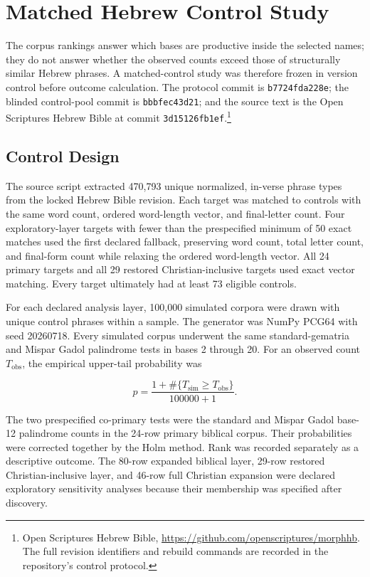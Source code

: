 \section{Matched Hebrew Control Study}

The corpus rankings answer which bases are productive inside the selected names; they do not answer whether the observed counts exceed those of structurally similar Hebrew phrases. A matched-control study was therefore frozen in version control before outcome calculation. The protocol commit is \texttt{b7724fda228e}; the blinded control-pool commit is \texttt{bbbfec43d21}; and the source text is the Open Scriptures Hebrew Bible at commit \texttt{3d15126fb1ef}.\footnote{Open Scriptures Hebrew Bible, \url{https://github.com/openscriptures/morphhb}. The full revision identifiers and rebuild commands are recorded in the repository's control protocol.}

\subsection{Control Design}

The source script extracted 470,793 unique normalized, in-verse phrase types from the locked Hebrew Bible revision. Each target was matched to controls with the same word count, ordered word-length vector, and final-letter count. Four exploratory-layer targets with fewer than the prespecified minimum of 50 exact matches used the first declared fallback, preserving word count, total letter count, and final-form count while relaxing the ordered word-length vector. All 24 primary targets and all 29 restored Christian-inclusive targets used exact vector matching. Every target ultimately had at least 73 eligible controls.

For each declared analysis layer, 100,000 simulated corpora were drawn with unique control phrases within a sample. The generator was NumPy PCG64 with seed 20260718. Every simulated corpus underwent the same standard-gematria and Mispar Gadol palindrome tests in bases 2 through 20. For an observed count $T_{\mathrm{obs}}$, the empirical upper-tail probability was

\[
p=\frac{1+\#\{T_{\mathrm{sim}}\geq T_{\mathrm{obs}}\}}{100000+1}.
\]

The two prespecified co-primary tests were the standard and Mispar Gadol base-12 palindrome counts in the 24-row primary biblical corpus. Their probabilities were corrected together by the Holm method. Rank was recorded separately as a descriptive outcome. The 80-row expanded biblical layer, 29-row restored Christian-inclusive layer, and 46-row full Christian expansion were declared exploratory sensitivity analyses because their membership was specified after discovery.

